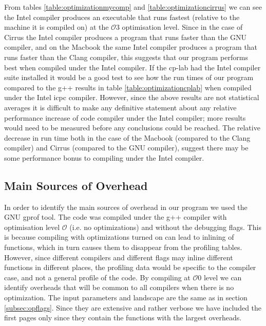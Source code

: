 From tables \ref{table:optimizationmycomp} and \ref{table:optimizationcirrus} we can see the Intel compiler produces an executable that runs fastest (relative to the machine it is compiled on) at the $\mathcal{O}3$ optimisation level. Since in the case of Cirrus the Intel compiler produces a program that runs faster than the GNU compiler, and on the Macbook the same Intel compiler produces a program that runs faster than the Clang compiler, this suggests that our program performs best when compiled under the Intel compiler. If the cp-lab had the Intel compiler suite installed it would be a good test to see how the run times of our program compared to the g++ results in table \ref{table:optimizationcplab} when compiled under the Intel icpc compiler. However, since the above results are not statistical averages it is difficult to make any definitive statement about any relative performance increase of code compiler under the Intel compiler; more results would need to be measured before any conclusions could be reached. The relative decrease in run time both in the case of the Macbook (compared to the Clang compiler) and Cirrus (compared to the GNU compiler), suggest there may be some performance bonus to compiling under the Intel compiler. 

\subsection{Main Sources of Overhead}
\label{subsec:overhead}
In order to identify the main sources of overhead in our program we used the GNU gprof tool. The code was compiled under the g++ compiler with optimisation level $\mathcal{O}$ (i.e. no optimizations) and without the debugging flags. This is because compiling with optimizations turned on can lead to inlining of functions, which in turn causes them to disappear from the profiling tables. However, since different compilers and different flags may inline different functions in different places, the profiling data would be specific to the compiler case, and not a general profile of the code. By compiling at $\mathcal{O}0$ level we can identify overheads that will be common to all compilers when there is no optimization. The input parameters and landscape are the same as in section \ref{subsec:opflags}. Since they are extensive and rather verbose we have included the first pages only since they contain the functions with the largest overheads.

